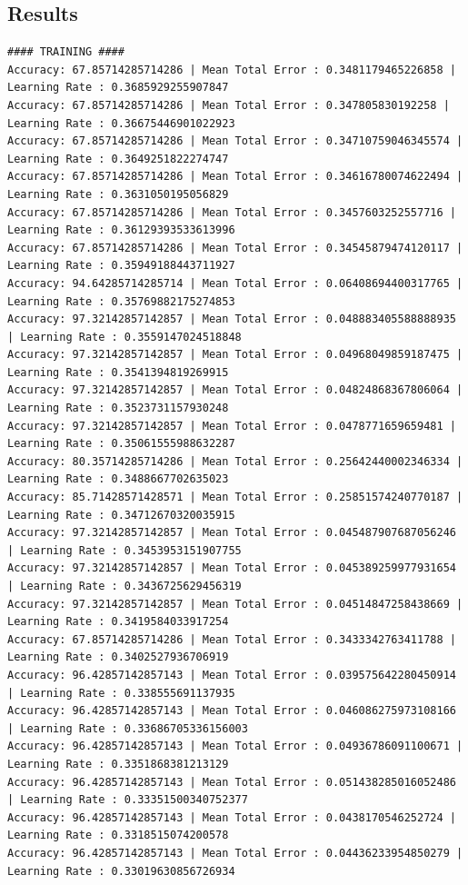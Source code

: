 \documentclass[]{report}
\begin{document}
\subsection{Results}
\begin{verbatim}
#### TRAINING ####
Accuracy: 67.85714285714286 | Mean Total Error : 0.3481179465226858 | Learning Rate : 0.3685929255907847
Accuracy: 67.85714285714286 | Mean Total Error : 0.347805830192258 | Learning Rate : 0.36675446901022923
Accuracy: 67.85714285714286 | Mean Total Error : 0.34710759046345574 | Learning Rate : 0.3649251822274747
Accuracy: 67.85714285714286 | Mean Total Error : 0.34616780074622494 | Learning Rate : 0.3631050195056829
Accuracy: 67.85714285714286 | Mean Total Error : 0.3457603252557716 | Learning Rate : 0.36129393533613996
Accuracy: 67.85714285714286 | Mean Total Error : 0.34545879474120117 | Learning Rate : 0.35949188443711927
Accuracy: 94.64285714285714 | Mean Total Error : 0.06408694400317765 | Learning Rate : 0.35769882175274853
Accuracy: 97.32142857142857 | Mean Total Error : 0.048883405588888935 | Learning Rate : 0.3559147024518848
Accuracy: 97.32142857142857 | Mean Total Error : 0.04968049859187475 | Learning Rate : 0.3541394819269915
Accuracy: 97.32142857142857 | Mean Total Error : 0.04824868367806064 | Learning Rate : 0.3523731157930248
Accuracy: 97.32142857142857 | Mean Total Error : 0.0478771659659481 | Learning Rate : 0.35061555988632287
Accuracy: 80.35714285714286 | Mean Total Error : 0.25642440002346334 | Learning Rate : 0.3488667702635023
Accuracy: 85.71428571428571 | Mean Total Error : 0.25851574240770187 | Learning Rate : 0.34712670320035915
Accuracy: 97.32142857142857 | Mean Total Error : 0.045487907687056246 | Learning Rate : 0.3453953151907755
Accuracy: 97.32142857142857 | Mean Total Error : 0.045389259977931654 | Learning Rate : 0.3436725629456319
Accuracy: 97.32142857142857 | Mean Total Error : 0.04514847258438669 | Learning Rate : 0.3419584033917254
Accuracy: 67.85714285714286 | Mean Total Error : 0.3433342763411788 | Learning Rate : 0.3402527936706919
Accuracy: 96.42857142857143 | Mean Total Error : 0.039575642280450914 | Learning Rate : 0.338555691137935
Accuracy: 96.42857142857143 | Mean Total Error : 0.046086275973108166 | Learning Rate : 0.33686705336156003
Accuracy: 96.42857142857143 | Mean Total Error : 0.04936786091100671 | Learning Rate : 0.3351868381213129
Accuracy: 96.42857142857143 | Mean Total Error : 0.051438285016052486 | Learning Rate : 0.33351500340752377
Accuracy: 96.42857142857143 | Mean Total Error : 0.0438170546252724 | Learning Rate : 0.3318515074200578
Accuracy: 96.42857142857143 | Mean Total Error : 0.04436233954850279 | Learning Rate : 0.33019630856726934

\end{verbatim}
\end{document}
